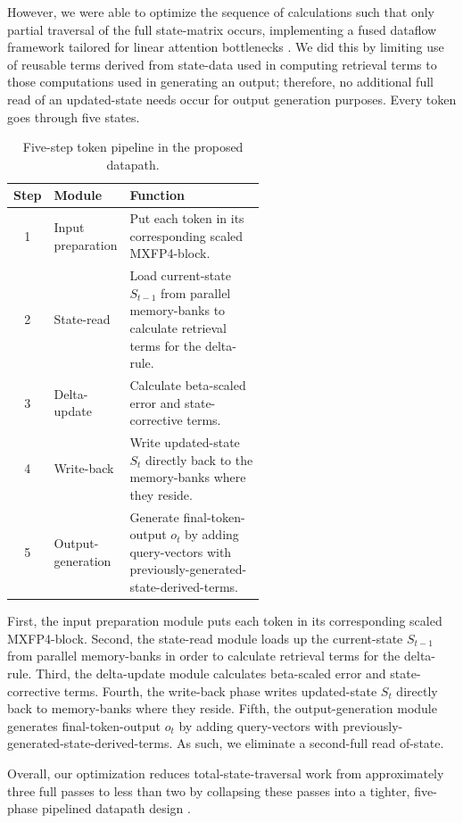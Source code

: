﻿\documentclass[conference]{IEEEtran}
\begin{document}
However, we were able to optimize the sequence of calculations such that only partial traversal of the full state-matrix occurs, implementing a fused dataflow framework tailored for linear attention bottlenecks \cite{b10}. We did this by limiting use of reusable terms derived from state-data used in computing retrieval terms to those computations used in generating an output; therefore, no additional full read of an updated-state needs occur for output generation purposes. Every token goes through five states.

\begin{table}[t]
\centering
\caption{Five-step token pipeline in the proposed datapath.}
\label{tab:five_step_token_pipeline}
\scriptsize
\begin{tabular}{clp{0.56\linewidth}}
\toprule
Step & Module & Function \\
\midrule
1 & Input preparation & Put each token in its corresponding scaled MXFP4-block. \\
2 & State-read & Load current-state $S_{t-1}$ from parallel memory-banks to calculate retrieval terms for the delta-rule. \\
3 & Delta-update & Calculate beta-scaled error and state-corrective terms. \\
4 & Write-back & Write updated-state $S_t$ directly back to the memory-banks where they reside. \\
5 & Output-generation & Generate final-token-output $o_t$ by adding query-vectors with previously-generated-state-derived-terms. \\
\bottomrule
\end{tabular}
\end{table}

First, the input preparation module puts each token in its corresponding scaled MXFP4-block. Second, the state-read module loads up the current-state $S_{t-1}$ from parallel memory-banks in order to calculate retrieval terms for the delta-rule. Third, the delta-update module calculates beta-scaled error and state-corrective terms. Fourth, the write-back phase writes updated-state $S_t$ directly back to memory-banks where they reside. Fifth, the output-generation module generates final-token-output $o_t$ by adding query-vectors with previously-generated-state-derived-terms. As such, we eliminate a second-full read of-state.

Overall, our optimization reduces total-state-traversal work from approximately three full passes to less than two by collapsing these passes into a tighter, five-phase pipelined datapath design \cite{b10}.
\end{document}
